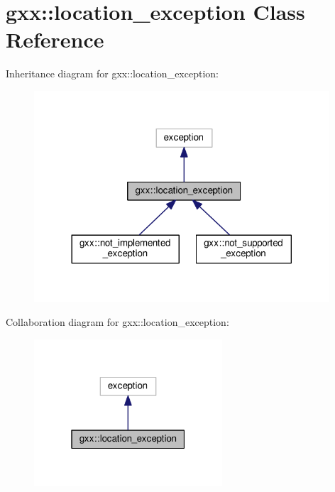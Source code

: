 \hypertarget{classgxx_1_1location__exception}{}\section{gxx\+:\+:location\+\_\+exception Class Reference}
\label{classgxx_1_1location__exception}


Inheritance diagram for gxx\+:\+:location\+\_\+exception\+:
\nopagebreak
\begin{figure}[H]
\begin{center}
\leavevmode
\includegraphics[width=312pt]{classgxx_1_1location__exception__inherit__graph}
\end{center}
\end{figure}


Collaboration diagram for gxx\+:\+:location\+\_\+exception\+:
\nopagebreak
\begin{figure}[H]
\begin{center}
\leavevmode
\includegraphics[width=199pt]{classgxx_1_1location__exception__coll__graph}
\end{center}
\end{figure}
